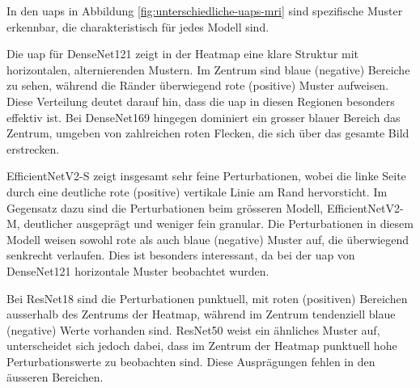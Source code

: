 In den \acrshort{uap}s in Abbildung \ref{fig:unterschiedliche-uaps-mri} sind spezifische Muster erkennbar, die charakteristisch für jedes Modell sind. 

Die \acrshort{uap} für DenseNet121 zeigt in der Heatmap eine klare Struktur mit horizontalen, alternierenden Mustern. Im Zentrum sind blaue (negative) Bereiche zu sehen, während die Ränder überwiegend rote (positive) Muster aufweisen. Diese Verteilung deutet darauf hin, dass die \acrshort{uap} in diesen Regionen besonders effektiv ist. Bei DenseNet169 hingegen dominiert ein grosser blauer Bereich das Zentrum, umgeben von zahlreichen roten Flecken, die sich über das gesamte Bild erstrecken.

EfficientNetV2-S zeigt insgesamt sehr feine Perturbationen, wobei die linke Seite durch eine deutliche rote (positive) vertikale Linie am Rand hervorsticht. Im Gegensatz dazu sind die Perturbationen beim grösseren Modell, EfficientNetV2-M, deutlicher ausgeprägt und weniger fein granular. Die Perturbationen in diesem Modell weisen sowohl rote als auch blaue (negative) Muster auf, die überwiegend senkrecht verlaufen. Dies ist besonders interessant, da bei der \acrshort{uap} von DenseNet121 horizontale Muster beobachtet wurden.

Bei ResNet18 sind die Perturbationen punktuell, mit roten (positiven) Bereichen ausserhalb des Zentrums der Heatmap, während im Zentrum tendenziell blaue (negative) Werte vorhanden sind. ResNet50 weist ein ähnliches Muster auf, unterscheidet sich jedoch dabei, dass im Zentrum der Heatmap punktuell hohe Perturbationswerte zu beobachten sind. Diese Ausprägungen fehlen in den äusseren Bereichen.

